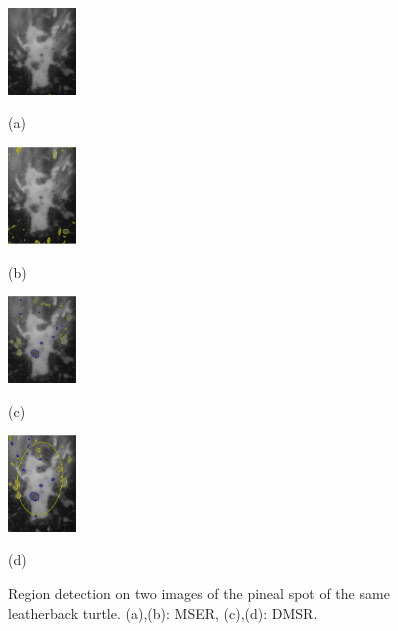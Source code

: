 \documentclass{article}
\begin{document}
\begin{figure}[htb]

\begin{minipage}[b]{.24\linewidth}
  \centering
  \centerline{\includegraphics[width=1.8cm]{./Figs/mserLeatherbackA}}
   \centerline{(a)}\medskip
\end{minipage}
\hfill
\begin{minipage}[b]{0.24\linewidth}
  \centering
  \centerline{\includegraphics[width=1.8cm]{./Figs/mserLeatherbackB}}
\centerline{(b)}\medskip
\end{minipage}
\hfill
\begin{minipage}[b]{.24\linewidth}
  \centering
  \centerline{\includegraphics[width=1.8cm]{./Figs/dmsrLeatherbackA}}
\centerline{(c)}\medskip
\end{minipage}
\hfill
\begin{minipage}[b]{0.24\linewidth}
  \centering
  \centerline{\includegraphics[width=1.8cm]{./Figs/dmsrLeatherbackB}}
 \centerline{(d)}\medskip
\end{minipage}
 \vspace{-0.2cm} 
\caption{Region detection on two images of the pineal spot of the same leatherback turtle.
(a),(b): MSER, (c),(d): DMSR.}
\label{fig:turtle}
 \vspace{-0.2cm}
\end{figure}
\end{document}
